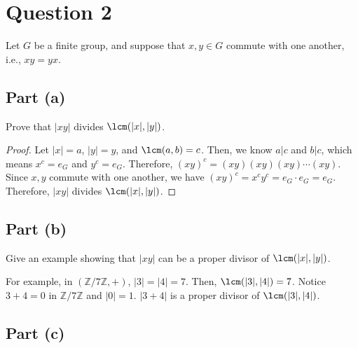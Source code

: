 \section{Question 2}

\begin{question}
    Let $G$ be a finite group, and suppose that $x,y \in G$ commute with one another, i.e., $xy = yx$.
\end{question}

\subsection{Part (a)}

\begin{question}
    Prove that $\lvert xy\rvert$ divides $\lcm(\lvert x\rvert,\lvert y\rvert)$.
\end{question}

\begin{answer}
    \begin{proof}
        Let $\lvert x \rvert = a$, $\lvert y \rvert = y$, and  $\lcm(a,b) = c$. Then, we know $a \lvert c$ and $b \lvert c$, which means $x^c = e_G$ and $y^c = e_G$. Therefore, $(xy)^c = (xy)(xy)(xy)\cdots(xy)$. Since $x,y$ commute with one another, we have $(xy)^c = x^cy^c = e_G\cdot e_G = e_G$. Therefore, $\lvert xy \rvert$ divides $\lcm(\lvert x \rvert, \lvert y \rvert)$.
    \end{proof}
\end{answer}

\subsection{Part (b)}

\begin{question}
    Give an example showing that $\lvert xy\rvert$ can be a proper divisor of $\lcm(\lvert x\rvert,\lvert y\rvert)$.
\end{question}

\begin{answer}
    For example, in $(\mathbb{Z}/7\mathbb{Z},+)$, $\lvert 3 \rvert = \lvert 4 \rvert = 7$. Then, $\lcm(\lvert 3 \rvert, \lvert 4 \rvert) = 7$. Notice $3 + 4 = 0$ in $\mathbb{Z}/7\mathbb{Z}$ and $\lvert 0 \rvert = 1$. $\lvert 3+4 \rvert$ is a proper divisor of $\lcm(\lvert 3 \rvert, \lvert 4 \rvert)$.
\end{answer}

\subsection{Part (c)}

